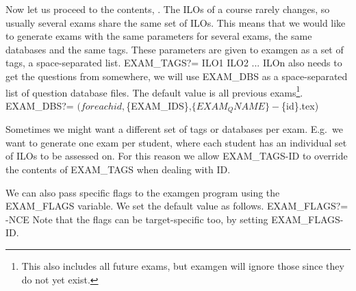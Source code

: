 Now let us proceed to the contents, .
The \acp{ILO} of a course rarely changes, so usually several exams share the 
same set of \acp{ILO}.
This means that we would like to generate exams with the same parameters for 
several exams, \eg the same databases and the same tags.
These parameters are given to {\Tt{}examgen\nwendquote} as a set of tags, \ie 
a space-separated list.
\nwenddocs{}\plusendmoddef\nwstartdeflinemarkup{}\nwenddeflinemarkup
EXAM_TAGS?=     ILO1 ILO2 ... ILOn
\nwendcode{} also needs to get the questions from somewhere, we will use 
{\Tt{}EXAM{\_}DBS\nwendquote} as a space-separated list of question database files.
The default value is all previous exams\footnote{%
  This also includes all future exams, but {\Tt{}examgen\nwendquote} will ignore those since 
  they do not yet exist.
}.
\nwenddocs{}\plusendmoddef\nwstartdeflinemarkup{}\nwenddeflinemarkup
EXAM_DBS?=      $(foreach id,$\{EXAM_IDS\},$\{EXAM_QNAME\}-$\{id\}.tex)
\nwendcode{}\nwdocspar

Sometimes we might want a different set of tags or databases per exam.
E.g.\ we want to generate one exam per student, where each student has an 
individual set of \acp{ILO} to be assessed on.
For this reason we allow {\Tt{}EXAM{\_}TAGS-ID\nwendquote} to override the contents of 
{\Tt{}EXAM{\_}TAGS\nwendquote} when dealing with ID.

We can also pass specific flags to the examgen program using the {\Tt{}EXAM{\_}FLAGS\nwendquote} 
variable.
We set the default value as follows.
\nwenddocs{}\plusendmoddef\nwstartdeflinemarkup{}\nwenddeflinemarkup
EXAM_FLAGS?=        -NCE
\nwendcode{}Note that the flags can be target-specific too, \ie by setting 
{\Tt{}EXAM{\_}FLAGS-ID\nwendquote}.

